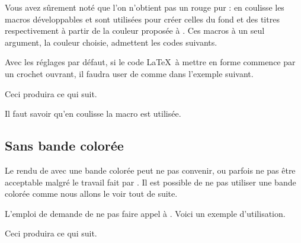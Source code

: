 \begin{tdocnote}
    Vous avez sûrement noté que l'on n'obtient pas un rouge pur : en coulisse les macros développables  et  sont utilisées pour créer celles du fond et des titres respectivement à partir de la couleur proposée à .
    Ces macros à un seul argument, la couleur choisie, admettent les codes suivants.

    \begin{tdoclatex}[code]
    \end{tdoclatex}
\end{tdocnote}




\begin{tdocwarn}
    Avec les réglages par défaut, si le code \LaTeX\ à mettre en forme commence par un crochet ouvrant, il faudra user de  comme dans l'exemple suivant.


    Ceci produira ce qui suit.

    \medskip

    
\end{tdocwarn}


\begin{tdocnote}
    Il faut savoir qu'en coulisse la macro  est utilisée.

    \begin{tdoclatex}[std]
    \end{tdoclatex}
\end{tdocnote}


\subsection{Sans bande colorée}

Le rendu de  avec une bande colorée peut ne pas convenir, ou parfois ne pas être acceptable malgré le travail fait par .
Il est possible de ne pas utiliser une bande colorée comme nous allons le voir tout de suite.


\begin{tdocexa}
    L'emploi de  demande de ne pas faire appel à .
    Voici un exemple d'utilisation.


    Ceci produira ce qui suit.

    \medskip

    
\end{tdocexa}


